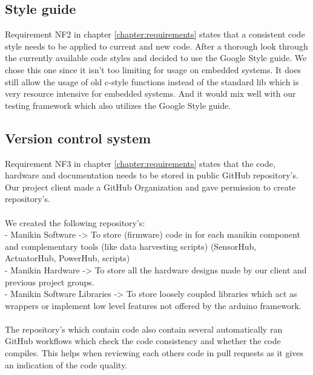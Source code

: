 \subsection{Style guide}
Requirement NF2 in chapter \ref{chapter:requirements} states that a consistent code style needs to be applied to current and new code. After a thorough look through the currently available code styles and decided to use the Google Style guide. We chose this one since it isn't too limiting for usage on embedded systems. It does still allow the usage of old c-style functions instead of the standard lib which is very resource intensive for embedded systems. And it would mix well with our testing framework which also utilizes the Google Style guide.
\subsection{Version control system}
Requirement NF3 in chapter \ref{chapter:requirements} states that the code, hardware and documentation needs to be stored in public GitHub repository's. Our project client made a GitHub Organization and gave permission to create repository's. \\\\
We created the following repository's:\\
- Manikin Software -> To store (firmware) code in for each manikin component and complementary tools (like data harvesting scripts) (SensorHub, ActuatorHub, PowerHub, scripts) \\
- Manikin Hardware -> To store all the hardware designs made by our client and previous project groups. \\
- Manikin Software Libraries -> To store loosely coupled libraries which act as wrappers or implement low level features not offered by the arduino framework. \\\\
The repository's which contain code also contain several automatically ran GitHub workflows which check the code consistency and whether the code compiles. This helps when reviewing each others code in pull requests as it gives an indication of the code quality.


